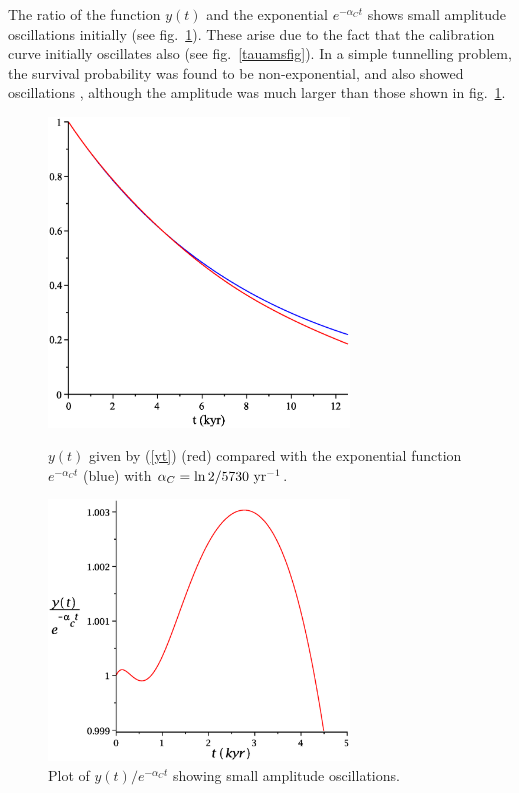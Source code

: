 \documentclass[12pt]{article}
\newcommand{\Ref}[1]{(\ref{#1})}
\begin{document}
The ratio of the function $y(t)$ and the exponential 
$e^{-\alpha_Ct}$ shows small amplitude oscillations initially (see
fig.~\ref{oscill}). These arise due to the fact that the calibration 
curve initially
oscillates also (see fig.~\ref{tauamsfig}). In a simple tunnelling problem,
the survival probability was found to be non-exponential, and also showed
oscillations \cite{dicus02}, although the amplitude was much larger than
those shown in fig.~\ref{oscill}.

\begin{figure}[t] 
\centerline{\includegraphics[width=8cm]{Aston-Fig3.eps}}
\vspace{-2mm}
\caption{$y(t)$ given by \Ref{yt} (red) compared with
the exponential function $e^{-\alpha_C t}$ (blue) with $\alpha_C=
\ln 2/5730~{\rm yr}^{-1}$.}
\label{yplot}
\vspace{3mm}
\centerline{\includegraphics[width=8cm]{Aston-Fig4.eps}}
\vspace{-2mm} 
\caption{Plot of $y(t)/e^{-\alpha_Ct}$ showing small amplitude 
oscillations.}
\label{oscill} 
\end{figure}
\end{document}
